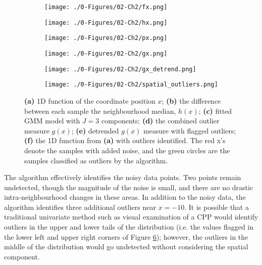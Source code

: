 \begin{figure}[!t]
    \begin{subfigure}{0.5\textwidth}
        \centering
        \texttt{[image: ./0-Figures/02-Ch2/fx.png]}
        \caption{}
        \label{fig:fx}
    \end{subfigure}
    \begin{subfigure}{0.5\textwidth}
        \centering
        \texttt{[image: ./0-Figures/02-Ch2/hx.png]}
        \caption{}
        \label{fig:hx}
    \end{subfigure}
    \begin{subfigure}{0.5\textwidth}
        \centering
        \texttt{[image: ./0-Figures/02-Ch2/px.png]}
        \caption{}
        \label{fig:px}
    \end{subfigure}
    \begin{subfigure}{0.5\textwidth}
        \centering
        \texttt{[image: ./0-Figures/02-Ch2/gx.png]}
        \caption{}
        \label{fig:gx}
    \end{subfigure}
    \begin{subfigure}{0.5\textwidth}
        \centering
        \texttt{[image: ./0-Figures/02-Ch2/gx\_detrend.png]}
        \caption{}
        \label{fig:gx_detrend}
    \end{subfigure}
    \begin{subfigure}{0.5\textwidth}
        \centering
        \texttt{[image: ./0-Figures/02-Ch2/spatial\_outliers.png]}
        \caption{}
        \label{fig:spatial_outliers}
    \end{subfigure}
    \caption{\textbf{(a)} \gls{1D} function of the coordinate position $x$; \textbf{(b)} the difference between each sample the neighbourhood median, $h(x)$; \textbf{(c)} fitted \gls{GMM} model with $J=3$ components; \textbf{(d)} the combined outlier measure $g(x)$; \textbf{(e)} detrended $g(x)$ measure with flagged outliers; \textbf{(f)} the \gls{1D} function from \textbf{(a)} with outliers identified. The red x's denote the samples with added noise, and the green circles are the samples classified as outliers by the algorithm.}
    \label{fig:outliers_1d}
\end{figure}

The algorithm effectively identifies the noisy data points. Two points remain undetected, though the magnitude of the noise is small, and there are no drastic intra-neighbourhood changes in these areas. In addition to the noisy data, the algorithm identifies three additional outliers near $x=-10$. It is possible that a traditional univariate method such as visual examination of a \gls{CPP} would identify outliers in the upper and lower tails of the distribution (i.e. the values flagged in the lower left and upper right corners of Figure \ref{fig:spatial_outliers}); however, the outliers in the middle of the distribution would go undetected without considering the spatial component.


